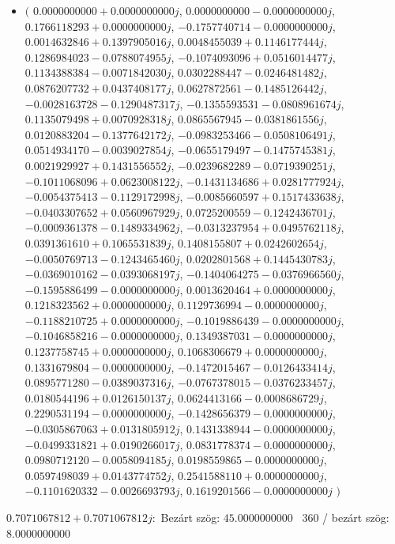 \documentclass[14pt,a4paper]{article}
\begin{document}
\begin{itemize}
\item
$\big($
$0.0000000000+0.0000000000j$, $0.0000000000-0.0000000000j$, $0.1766118293+0.0000000000j$, $-0.1757740714-0.0000000000j$, $0.0014632846+0.1397905016j$, $0.0048455039+0.1146177444j$, $0.1286984023-0.0788074955j$, $-0.1074093096+0.0516014477j$, $0.1134388384-0.0071842030j$, $0.0302288447-0.0246481482j$, $0.0876207732+0.0437408177j$, $0.0627872561-0.1485126442j$, $-0.0028163728-0.1290487317j$, $-0.1355593531-0.0808961674j$, $0.1135079498+0.0070928318j$, $0.0865567945-0.0381861556j$, $0.0120883204-0.1377642172j$, $-0.0983253466-0.0508106491j$, $0.0514934170-0.0039027854j$, $-0.0655179497-0.1475745381j$, $0.0021929927+0.1431556552j$, $-0.0239682289-0.0719390251j$, $-0.1011068096+0.0623008122j$, $-0.1431134686+0.0281777924j$, $-0.0054375413-0.1129172998j$, $-0.0085660597+0.1517433638j$, $-0.0403307652+0.0560967929j$, $0.0725200559-0.1242436701j$, $-0.0009361378-0.1489334962j$, $-0.0313237954+0.0495762118j$, $0.0391361610+0.1065531839j$, $0.1408155807+0.0242602654j$, $-0.0050769713-0.1243465460j$, $0.0202801568+0.1445430783j$, $-0.0369010162-0.0393068197j$, $-0.1404064275-0.0376966560j$, $-0.1595886499-0.0000000000j$, $0.0013620464+0.0000000000j$, $0.1218323562+0.0000000000j$, $0.1129736994-0.0000000000j$, $-0.1188210725+0.0000000000j$, $-0.1019886439-0.0000000000j$, $-0.1046858216-0.0000000000j$, $0.1349387031-0.0000000000j$, $0.1237758745+0.0000000000j$, $0.1068306679+0.0000000000j$, $0.1331679804-0.0000000000j$, $-0.1472015467-0.0126433414j$, $0.0895771280-0.0389037316j$, $-0.0767378015-0.0376233457j$, $0.0180544196+0.0126150137j$, $0.0624413166-0.0008686729j$, $0.2290531194-0.0000000000j$, $-0.1428656379-0.0000000000j$, $-0.0305867063+0.0131805912j$, $0.1431338944-0.0000000000j$, $-0.0499331821+0.0190266017j$, $0.0831778374-0.0000000000j$, $0.0980712120-0.0058094185j$, $0.0198559865-0.0000000000j$, $0.0597498039+0.0143774752j$, $0.2541588110+0.0000000000j$, $-0.1101620332-0.0026693793j$, $0.1619201566-0.0000000000j$
$\big)$
\end{itemize}
$0.7071067812+0.7071067812j$:\
Bezárt szög: $45.0000000000$ \
360 / bezárt szög: $8.0000000000$\
\end{document}
